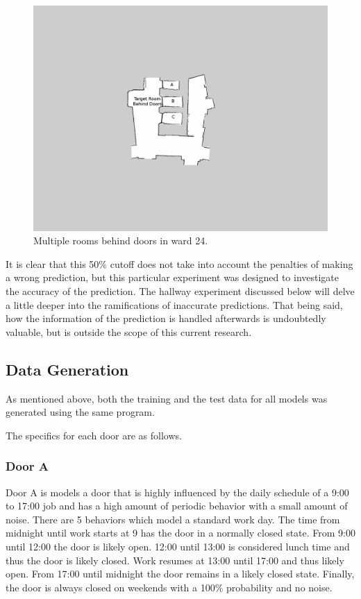   \begin{figure}[!htb]
    \centering
    \includegraphics[width=\linewidth]{images/ward_24_door.png}
    \caption{Multiple rooms behind doors in ward 24.}
    \label{figure:ward_24_door}
  \end{figure}

  It is clear that this 50\% cutoff does not take into account the penalties
  of making a wrong prediction, but this particular experiment was designed to
  investigate the accuracy of the prediction. The hallway experiment discussed
  below will delve a little deeper into the ramifications of inaccurate
  predictions. That being said, how the information of the prediction is
  handled afterwards is undoubtedly valuable, but is outside the scope of this
  current research.

  \subsection{ Data Generation }

  As mentioned above, both the training and the test data for all models was
  generated using the same program.

  The specifics for each door are as follows.

  \subsubsection{ Door A }

  Door A is models a door that is highly influenced by the daily schedule of a
  9:00 to 17:00 job and has a high amount of periodic behavior with a small
  amount of noise.  There are 5 behaviors which model a standard work day. The
  time from midnight until work starts at 9 has the door in a normally closed
  state.  From 9:00 until 12:00 the door is likely open. 12:00 until 13:00 is
  considered lunch time and thus the door is likely closed. Work resumes at
  13:00 until 17:00 and thus likely open. From 17:00 until midnight
  the door remains in a likely closed state. Finally, the door is always
  closed on weekends with a 100\% probability and no noise. \\

